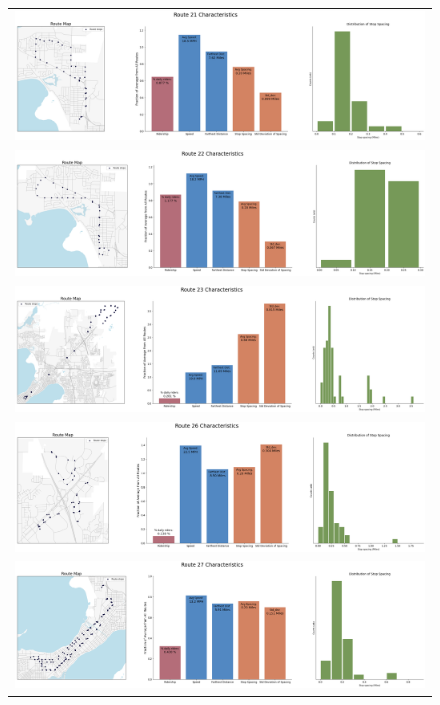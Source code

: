 \documentclass[letter]{article}
\begin{document}
\begin{figure}
\begin{center}
\begin{tabular}{ c }

  \includegraphics[width=150mm]{Route_21.png} \\
  \includegraphics[width=150mm]{Route_22.png}  \\
  \includegraphics[width=150mm]{Route_23.png}  \\
  \includegraphics[width=150mm]{Route_26.png}  \\
  \includegraphics[width=150mm]{Route_27.png} \\ 
  
  \end{tabular}
\end{center}
\end{figure}
\end{document}
